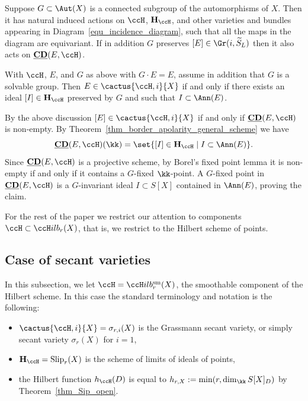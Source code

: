 \documentclass[12pt,a4paper]{article}
\newcommand{\usualHilb}{{\ccH}ilb}
\newcommand{\usualHilbsm}[2][r]{\usualHilb_{#1} ^{\operatorname{sm}}{(#2)}}
\newcommand{\bCD}{\underline{\mathbf{CD}}}
\DeclareMathOperator{\Slip}{Slip}
\begin{document}
Suppose $G\subset \Aut(X)$ is a connected subgroup of the automorphisms of $X$.
Then it has natural induced actions on $\ccH$, $\mathbf{H}_{\ccH}$, and other varieties and bundles appearing in Diagram~\eqref{equ_incidence_diagram}, such that all the maps in the diagram are equivariant.
If in addition $G$ preserves $[E]\in \Gr(i, \widetilde{S}_L)$ then it also acts on $\bCD(E, \ccH)$.

\begin{thm}
   \label{thm_FIT_for_general_scheme}
   With $\ccH$, $E$, and $G$ as above with $G\cdot E = E$,
   assume in addition that $G$ is a solvable group.
   Then $E\in \cactus{\ccH,i}{X}$  if and only if there exists an ideal $[I]\in \mathbf{H}_{\ccH}$
   preserved by $G$ and such that $I \subset \Ann(E)$.
\end{thm}
\begin{prf}
   By the above discussion $[E]\in \cactus{\ccH,i}{X}$ if and only if $\bCD(E, \ccH)$ is non-empty.
   By Theorem~\ref{thm_border_apolarity_general_scheme}
    we have
    \[
       \bCD(E, \ccH)(\kk) = \set{[I]\in \mathbf{H}_{\ccH}
       \mid I \subset \Ann(E)}.
    \]
    Since $\bCD(E, \ccH)$ is a projective scheme, by Borel's fixed point lemma \cite[Thm~10.4]{borel} it is non-empty if and only if it contains a $G$-fixed
    $\kk$-point.
    A $G$-fixed point in $\bCD(E, \ccH)$
    is a $G$-invariant ideal $I\subset S[X]$ contained in $\Ann(E)$, proving the claim.
\end{prf}

For the rest of the paper we restrict our attention to components $\ccH\subset \usualHilb_r(X)$, that is, we restrict
to the Hilbert scheme of points.

\subsection{Case of secant varieties}

In this subsection, we let $\ccH = \usualHilbsm{X}$, the smoothable component of the Hilbert scheme.
In this case the standard terminology and notation is the following:
\begin{itemize}
 \item $\cactus{\ccH,i}{X} = \sigma_{r,i}(X)$ is the Grassmann secant variety, or simply secant variety
 $\sigma_r(X)$ for $i=1$,
 \item $\mathbf{H}_{\ccH} =\Slip_r(X)$ is the scheme of limits of ideals of points,
 \item the Hilbert function $h_{\ccH}(D)$ is equal to $h_{r,X}:= \min(r, \dim_{\kk} S[X]_D)$ by Theorem~\ref{thm_Sip_open}.
\end{itemize}
\end{document}
